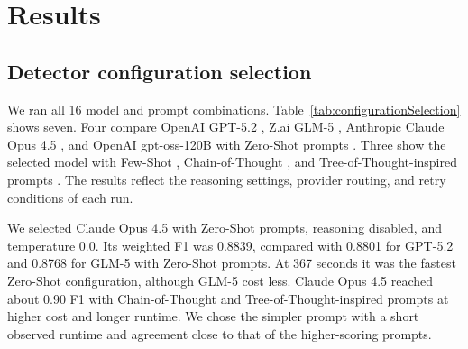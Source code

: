 \section{Results}\label{sec:results}

\subsection{Detector configuration selection}\label{sec:detectorSelectionResults}

We ran all \num{16} model and prompt combinations. Table~\ref{tab:configurationSelection} shows seven. Four compare OpenAI GPT-5.2 , Z.ai GLM-5 , Anthropic Claude Opus 4.5 , and OpenAI gpt-oss-120B  with Zero-Shot prompts . Three show the selected model with Few-Shot , Chain-of-Thought , and Tree-of-Thought-inspired prompts . The results reflect the reasoning settings, provider routing, and retry conditions of each run.

We selected Claude Opus 4.5 with Zero-Shot prompts, reasoning disabled, and temperature \num{0.0}. Its weighted F1 was \num{0.8839}, compared with \num{0.8801} for GPT-5.2 and \num{0.8768} for GLM-5 with Zero-Shot prompts. At \num{367} seconds it was the fastest Zero-Shot configuration, although GLM-5 cost less. Claude Opus 4.5 reached about \num{0.90} F1 with Chain-of-Thought and Tree-of-Thought-inspired prompts at higher cost and longer runtime. We chose the simpler prompt with a short observed runtime and agreement close to that of the higher-scoring prompts.

